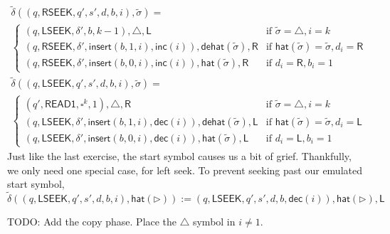 \documentclass[12pt]{article}
\begin{document}
\begin{multline*}
\tilde{\delta}((q, \textsf{RSEEK}, q', s', d, b, i), \tilde{\sigma}) = \\
\begin{cases}
(q, \textsf{LSEEK}, \delta', b, k-1), \triangle, \textsf{L} & \text{if } \tilde{\sigma} = \triangle, i = k \\
(q, \textsf{RSEEK}, \delta', \textsf{insert}(b, 1, i), \textsf{inc}(i)), \textsf{dehat}(\tilde{\sigma}), \textsf{R} & \text{if } \textsf{hat}(\tilde{\sigma}) = \tilde{\sigma}, d_i = \textsf{R} \\
(q, \textsf{RSEEK}, \delta', \textsf{insert}(b, 0, i), \textsf{inc}(i)), \textsf{hat}(\tilde{\sigma}), \textsf{R} & \text{if } d_i = \textsf{R}, b_i = 1
\end{cases}
\end{multline*}
\begin{multline*}
\tilde{\delta}((q, \textsf{LSEEK}, q', s', d, b, i), \tilde{\sigma}) = \\
\begin{cases}
(q', \textsf{READ1}, \square^k, 1), \triangle, \textsf{R} & \text{if } \tilde{\sigma} = \triangle, i = k \\
(q, \textsf{LSEEK}, \delta', \textsf{insert}(b, 1, i), \textsf{dec}(i)), \textsf{dehat}(\tilde{\sigma}), \textsf{L} & \text{if } \textsf{hat}(\tilde{\sigma}) = \tilde{\sigma}, d_i = \textsf{L} \\
(q, \textsf{LSEEK}, \delta', \textsf{insert}(b, 0, i), \textsf{dec}(i)), \textsf{hat}(\tilde{\sigma}), \textsf{L} & \text{if } d_i = \textsf{L}, b_i = 1
\end{cases}
\end{multline*}
Just like the last exercise, the start symbol causes us a bit of grief. Thankfully, we only need one special case, for left seek. To prevent seeking past our emulated start symbol,
$$
\tilde{\delta}((q, \textsf{LSEEK}, q', s', d, b, i), \textsf{hat}(\triangleright)) := (q, \textsf{LSEEK}, q', s', d, b, \textsf{dec}(i)), \textsf{hat}(\triangleright), \textsf{L}
$$
 
TODO: Add the copy phase. Place the $\triangle$ symbol in $i\neq1$.
\end{document}
